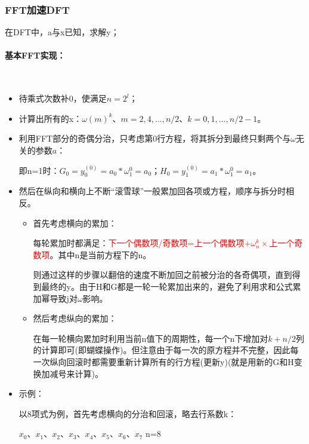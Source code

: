 \documentclass[UTF8]{article}%
\begin{document}
\subsubsection{FFT加速DFT}

在DFT中，a与x已知，求解y；

\paragraph{基本FFT实现：}~{}

\begin{itemize}
    \item 待乘式次数补0，使满足$n=2^l$；
    \item 计算出所有的x：$\omega(m)^k$、$m=2,4,...,n/2$、$k=0,1,...,n/2-1$。
    \item 利用FFT部分的奇偶分治，只考虑第0行方程，将其拆分到最终只剩两个与$\omega$无关的参数$a$：
    
    即n=1时：$G_0=y_0^{(0)}=a_0*\omega_1^0=a_0$；$H_0=y_1^{(0)}=a_1*\omega_1^0=a_1$。

    \item 然后在纵向和横向上不断“滚雪球”一般累加回各项或方程，顺序与拆分时相反。
    
    {
        \begin{itemize}
            \item 首先考虑横向的累加：
            
            每轮累加时都满足：\textcolor{red}{下一个偶数项/奇数项=上一个偶数项+$\omega_n^k×$上一个奇数项}。其中n是当前方程下的n。
            
            则通过这样的步骤以翻倍的速度不断加回之前被分治的各奇偶项，直到得到最终的y。由于H和G都是一轮一轮累加出来的，避免了利用求和公式累加幂导致j对$\omega$影响。

            \item 然后考虑纵向的累加：
            
            在每一轮横向累加时利用当前n值下的周期性，每一个n下增加对$k+n/2$列的计算即可(即蝴蝶操作)。但注意由于每一次的原方程并不完整，因此每一次纵向回滚时都需要重新计算所有的行方程(更新y)(就是用新的G和H变换加减号来计算)。

        \end{itemize}
    }            
    
    \item 示例：
    
    以8项式为例，首先考虑横向的分治和回滚，略去行系数k：
    
    $x_0$、$x_1$、$x_2$、$x_3$、$x_4$、$x_5$、$x_6$、$x_7$ \qquad n=8
    

\end{itemize}
\end{document}
